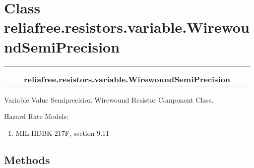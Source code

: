%
%
%


\section{Class reliafree.resistors.variable.WirewoundSemiPrecision}

    \label{reliafree:resistors:variable:WirewoundSemiPrecision}
\begin{tabular}{cccccc}
\multicolumn{2}{r}{\settowidth{\BCL}{reliafree.resistors.resistor.Resistor}\multirow{2}{\BCL}{reliafree.resistors.resistor.Resistor}}
&&
  \\\cline{3-3}
  &&\multicolumn{1}{c|}{}
&&
  \\
&&\multicolumn{2}{l}{\textbf{reliafree.resistors.variable.WirewoundSemiPrecision}}
\end{tabular}

Variable Value Semiprecision Wirewound Resistor Component Class.

Hazard Rate Models:

\begin{enumerate}

\setlength{\parskip}{0.5ex}
  \item MIL-HDBK-217F, section 9.11

\end{enumerate}



  \subsection{Methods}

    \vspace{0.5ex}

